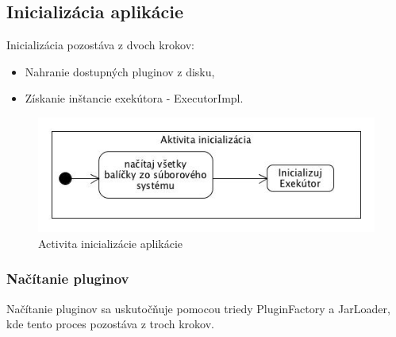 \subsection{Inicializácia aplikácie}
\indent Inicializácia pozostáva z dvoch krokov:
\begin{itemize}
	\item Nahranie dostupných pluginov z disku,
	\item Získanie inštancie exekútora - ExecutorImpl.
\end{itemize}
\begin{figure}[!htbp]
	\centering
	\includegraphics[scale=0.8]{img/initialization.jpg}
	\caption{Activita inicializácie aplikácie}
	\label{fig:test}
\end{figure}
\subsubsection{Načítanie pluginov}
\indent Načítanie pluginov sa uskutočňuje pomocou triedy PluginFactory a JarLoader, kde tento proces pozostáva z troch krokov.\newline
